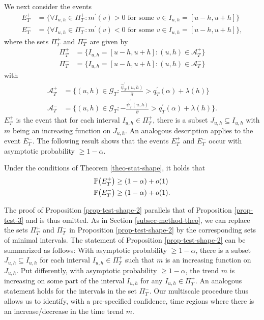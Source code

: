 We next consider the events
\begin{align*}
E_T^+ & = \Big\{ \forall I_{u,h} \in \Pi_T^+: m^\prime(v) > 0 \text{ for some } v \in I_{u,h} = [u-h,u+h] \Big\} \\
E_T^- & = \Big\{ \forall I_{u,h} \in \Pi_T^-: m^\prime(v) < 0 \text{ for some } v \in I_{u,h} = [u-h,u+h] \Big\},
\end{align*}
where the sets $\Pi_T^+$ and $\Pi_T^-$ are given by
\begin{align*}
\Pi_T^+ & = \big\{ I_{u,h} = [u-h,u+h]: (u,h) \in \mathcal{A}_T^+ \big\} \\
\Pi_T^- & = \big\{ I_{u,h} = [u-h,u+h]: (u,h) \in \mathcal{A}_T^- \big\} 
\end{align*}
with 
\begin{align*}
\mathcal{A}_T^+ & = \Big\{ (u,h) \in \mathcal{G}_T: \frac{\widehat{\psi}_T^\prime(u,h)}{\widehat{\sigma}} > q_T^\prime(\alpha) + \lambda(h) \Big\} \\ 
\mathcal{A}_T^- & = \Big\{ (u,h) \in \mathcal{G}_T: -\frac{\widehat{\psi}_T^\prime(u,h)}{\widehat{\sigma}} > q_T^\prime(\alpha) + \lambda(h) \Big\}. 
\end{align*}
$E_T^+$ is the event that for each interval $I_{u,h} \in \Pi_T^+$, there is a subset $J_{u,h} \subseteq I_{u,h}$ with $m$ being an increasing function on $J_{u,h}$. An analogous description applies to the event $E_T^-$. The following result shows that the events $E_T^+$ and $E_T^-$ occur with asymptotic probability $\ge 1-\alpha$. 
\begin{prop}\label{prop-test-shape-2}
Under the conditions of Theorem \ref{theo-stat-shape}, it holds that  
\begin{align*}
\mathbb{P} \big( E_T^+ \big) & \ge (1-\alpha) + o(1) \\
\mathbb{P} \big( E_T^- \big) & \ge (1-\alpha) + o(1). 
\end{align*}
\end{prop}
The proof of Proposition \ref{prop-test-shape-2} parallels that of Proposition \ref{prop-test-3} and is thus omitted. As in Section \ref{subsec-method-theo}, we can replace the sets $\Pi_T^+$ and $\Pi_T^-$ in Proposition \ref{prop-test-shape-2} by the corresponding sets of minimal intervals. The statement of Proposition \ref{prop-test-shape-2} can be summarized as follows: With asymptotic probability $\ge 1-\alpha$, there is a subset $J_{u,h} \subseteq I_{u,h}$ for each interval $I_{u,h} \in \Pi_T^+$ such that $m$ is an increasing function on $J_{u,h}$. Put differently, with asymptotic probability $\ge 1- \alpha$, the trend $m$ is increasing on some part of the interval $I_{u,h}$ for any $I_{u,h} \in \Pi_T^+$. An analogous statement holds for the intervals in the set $\Pi_T^-$. Our multiscale procedure thus allows us to identify, with a pre-specified confidence, time regions where there is an increase/decrease in the time trend $m$. 



